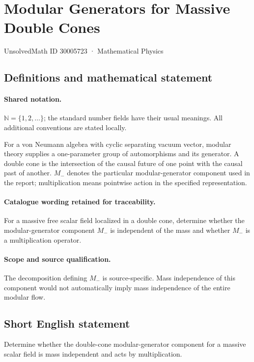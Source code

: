 \documentclass[11pt]{article}
\begin{document}
\setcounter{section}{30005722}
\section{Modular Generators for Massive Double Cones}\label{30005723}
{\small UnsolvedMath ID 30005723 · Mathematical Physics}
\subsection{Definitions and mathematical statement}

\paragraph{Shared notation.}$\mathbb N=\{1,2,\ldots\}$; the standard number fields have their usual meanings. All additional conventions are stated locally.


For a von Neumann algebra with cyclic separating vacuum vector, modular theory supplies a one-parameter group of automorphisms and its generator. A double cone is the intersection of the causal future of one point with the causal past of another. $M_-$ denotes the particular modular-generator component used in the report; multiplication means pointwise action in the specified representation.

\paragraph{Catalogue wording retained for traceability.}
For a massive free scalar field localized in a double cone, determine whether the modular-generator component $M_-$ is independent of the mass and whether $M_-$ is a multiplication operator.

\paragraph{Scope and source qualification.}The decomposition defining $M_-$ is source-specific. Mass independence of this component would not automatically imply mass independence of the entire modular flow.
\subsection{Short English statement}
Determine whether the double-cone modular-generator component for a massive scalar field is mass independent and acts by multiplication.
\end{document}
